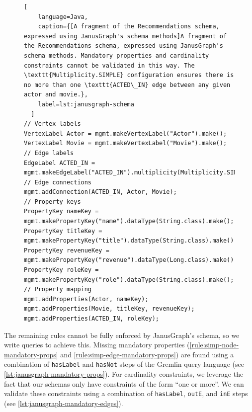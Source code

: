 \documentclass{report}
\theoremstyle{definition}
\begin{document}
\begin{figure}[H]
  \begin{lstlisting}[
    language=Java,
    caption={[A fragment of the Recommendations schema, expressed using JanusGraph's schema methods]A fragment of the Recommendations schema, expressed using JanusGraph's schema methods. Mandatory properties and cardinality constraints cannot be validated in this way. The \texttt{Multiplicity.SIMPLE} configuration ensures there is no more than one \texttt{ACTED\_IN} edge between any given actor and movie.},
    label=lst:janusgraph-schema
  ]
// Vertex labels
VertexLabel Actor = mgmt.makeVertexLabel("Actor").make();
VertexLabel Movie = mgmt.makeVertexLabel("Movie").make();
// Edge labels
EdgeLabel ACTED_IN = mgmt.makeEdgeLabel("ACTED_IN").multiplicity(Multiplicity.SIMPLE).make();
// Edge connections
mgmt.addConnection(ACTED_IN, Actor, Movie);
// Property keys
PropertyKey nameKey = mgmt.makePropertyKey("name").dataType(String.class).make();
PropertyKey titleKey = mgmt.makePropertyKey("title").dataType(String.class).make();
PropertyKey revenueKey = mgmt.makePropertyKey("revenue").dataType(Long.class).make();
PropertyKey roleKey = mgmt.makePropertyKey("role").dataType(String.class).make();
// Property mapping
mgmt.addProperties(Actor, nameKey);
mgmt.addProperties(Movie, titleKey, revenueKey);
mgmt.addProperties(ACTED_IN, roleKey);
  \end{lstlisting}
\end{figure}

The remaining rules cannot be fully enforced by JanusGraph's schema, so we write queries to achieve this. Missing mandatory properties (\autoref{rule:simp-node-mandatory-props} and \ref{rule:simp-edge-mandatory-props}) are found using a combination of \texttt{hasLabel} and \texttt{hasNot} steps of the Gremlin query language (see \autoref{lst:janusgraph-mandatory-props}). For cardinality constraints, we leverage the fact that our schemas only have constraints of the form ``one or more''. We can validate these constraints using a combination of \texttt{hasLabel}, \texttt{outE}, and \texttt{inE} steps (see \autoref{lst:janusgraph-mandatory-edges}).
\end{document}
